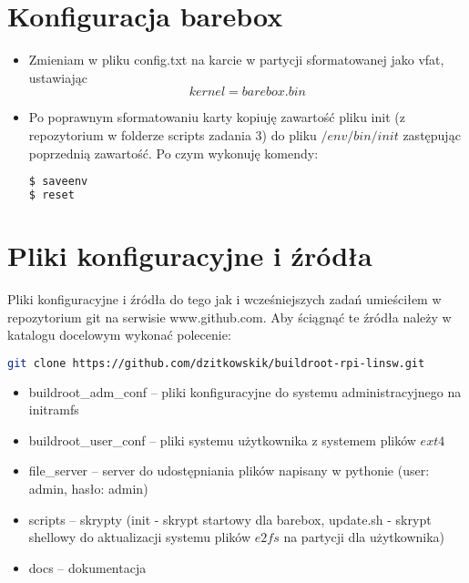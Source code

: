 \section{Konfiguracja barebox}
\begin{itemize}
\item Zmieniam w pliku config.txt na karcie w partycji sformatowanej jako vfat, ustawiając
$$kernel=barebox.bin$$
\item Po poprawnym sformatowaniu karty kopiuję zawartość pliku init (z repozytorium w folderze scripts zadania 3) do pliku $ /env/bin/init $ zastępując poprzednią zawartość. Po czym wykonuję komendy:
\begin{lstlisting}[language=bash]
$ saveenv
$ reset
\end{lstlisting}	
\end{itemize}

\section{Pliki konfiguracyjne i źródła}
Pliki konfiguracyjne i źródła do tego jak i wcześniejszych zadań umieściłem w repozytorium
git na serwisie www.github.com. Aby ściągnąć te źródła należy w katalogu docelowym wykonać polecenie:
\begin{lstlisting}[language=bash]
git clone https://github.com/dzitkowskik/buildroot-rpi-linsw.git
\end{lstlisting}	
\begin{itemize}
\item buildroot\_adm\_conf -- pliki konfiguracyjne do systemu administracyjnego na initramfs
\item buildroot\_user\_conf -- pliki systemu użytkownika z systemem plików $ext4$
\item file\_server -- server do udostępniania plików napisany w pythonie (user: admin, hasło: admin)
\item scripts -- skrypty (init - skrypt startowy dla barebox, update.sh - skrypt shellowy do aktualizacji systemu plików $e2fs$ na partycji dla użytkownika)
\item docs -- dokumentacja
\end{itemize}

